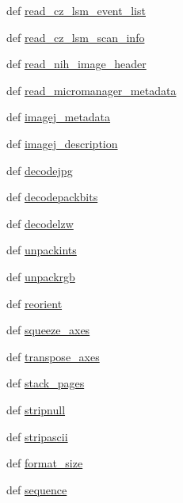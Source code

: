 \begin{DoxyCompactItemize}
\item 
def \hyperlink{namespacetifffile_a43f0f2d34a16be9065eb50fc3cd3fa63}{read\-\_\-cz\-\_\-lsm\-\_\-event\-\_\-list}
\item 
def \hyperlink{namespacetifffile_a926f204cc13e5de58febaa9bf995e2c3}{read\-\_\-cz\-\_\-lsm\-\_\-scan\-\_\-info}
\item 
def \hyperlink{namespacetifffile_a907fd00c94936d82b4aa7e962b0115e3}{read\-\_\-nih\-\_\-image\-\_\-header}
\item 
def \hyperlink{namespacetifffile_ac60bf0e2043755d8267a67ced0a7063a}{read\-\_\-micromanager\-\_\-metadata}
\item 
def \hyperlink{namespacetifffile_a92ad3e9d0fc0e838d086588f40a3d4f2}{imagej\-\_\-metadata}
\item 
def \hyperlink{namespacetifffile_a23a3f2df073b102b1a0522d66355a472}{imagej\-\_\-description}
\item 
def \hyperlink{namespacetifffile_ae20aaad12fd429f8d0c62b9201bb2521}{decodejpg}
\item 
def \hyperlink{namespacetifffile_a57e7eb408564ac6f7c8b85167d8cf462}{decodepackbits}
\item 
def \hyperlink{namespacetifffile_a2376f357e1c0ea59e65706f467b07cad}{decodelzw}
\item 
def \hyperlink{namespacetifffile_a48184e91218061fed4561e60fd88c2cf}{unpackints}
\item 
def \hyperlink{namespacetifffile_a692c583f894a70e549de21777c409b99}{unpackrgb}
\item 
def \hyperlink{namespacetifffile_afe0967c8e313a055a424ce6a99c0d134}{reorient}
\item 
def \hyperlink{namespacetifffile_a8e1101083059f78981492d856f515f81}{squeeze\-\_\-axes}
\item 
def \hyperlink{namespacetifffile_a68280735be0c7ed83d0ac3c69bc8ef37}{transpose\-\_\-axes}
\item 
def \hyperlink{namespacetifffile_a24b23a861083f2e07a3b5f6f12eebe7a}{stack\-\_\-pages}
\item 
def \hyperlink{namespacetifffile_ae7a94a18cdf3d70fe84d269c80891338}{stripnull}
\item 
def \hyperlink{namespacetifffile_a94e49403a3c1baad7f5bf9cc7e994e63}{stripascii}
\item 
def \hyperlink{namespacetifffile_a60d2ec1772fa88fddc525ee3584068e2}{format\-\_\-size}
\item 
def \hyperlink{namespacetifffile_af4f9f2085a2c89e83baa88a5f372c0f3}{sequence}
\item 

\end{DoxyCompactItemize}
